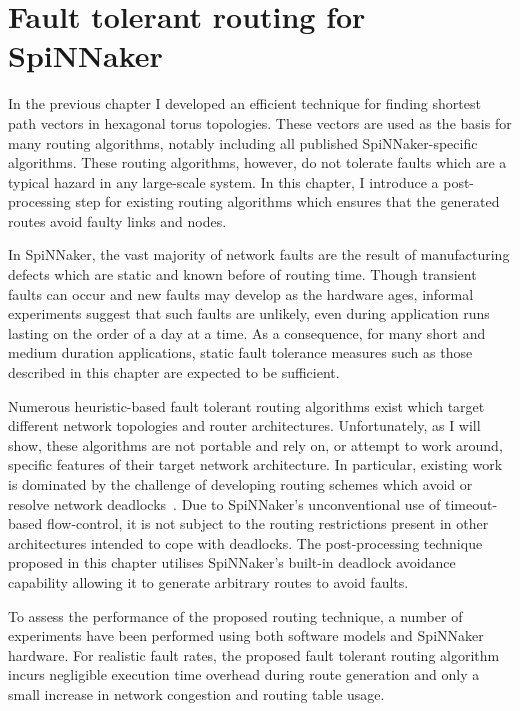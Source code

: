 \chapter{Fault tolerant routing for SpiNNaker}
	
	\label{sec:routing}
	
	In the previous chapter I developed an efficient technique for finding
	shortest path vectors in hexagonal torus topologies. These vectors are used
	as the basis for many routing algorithms, notably including all published
	SpiNNaker-specific algorithms. These routing algorithms, however, do not
	tolerate faults which are a typical hazard in any large-scale system. In this
	chapter, I introduce a post-processing step for existing routing algorithms
	which ensures that the generated routes avoid faulty links and nodes.
	
	In SpiNNaker, the vast majority of network faults are the result of
	manufacturing defects which are static and known before of routing time.
	Though transient faults can occur and new faults may develop as the hardware
	ages, informal experiments suggest that such faults are unlikely, even during
	application runs lasting on the order of a day at a time. As a consequence,
	for many short and medium duration applications, static fault tolerance
	measures such as those described in this chapter are expected to be
	sufficient.
	
	Numerous heuristic-based fault tolerant routing algorithms exist which target
	different network topologies and router architectures. Unfortunately, as I
	will show, these algorithms are not portable and rely on, or attempt to work
	around, specific features of their target network architecture. In
	particular, existing work is dominated by the challenge of developing routing
	schemes which avoid or resolve network deadlocks~\cite[chapter~14]{dally04}.
	Due to SpiNNaker's unconventional use of timeout-based flow-control, it is
	not subject to the routing restrictions present in other architectures
	intended to cope with deadlocks. The post-processing technique proposed in
	this chapter utilises SpiNNaker's built-in deadlock avoidance capability
	allowing it to generate arbitrary routes to avoid faults.
	
	To assess the performance of the proposed routing technique, a number of
	experiments have been performed using both software models and SpiNNaker
	hardware. For realistic fault rates, the proposed fault tolerant routing
	algorithm incurs negligible execution time overhead during route generation
	and only a small increase in network congestion and routing table usage.
	
